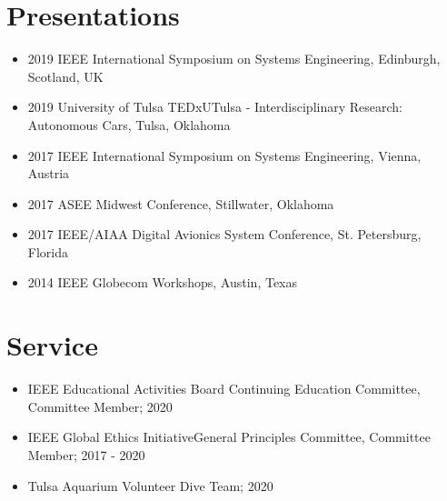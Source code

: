 \documentclass[line]{res} %
\begin{document}
\begin{resume}
\vspace{0.2in} %

\section{Presentations} 
\begin{itemize}
\item 2019 IEEE International Symposium on Systems Engineering, Edinburgh, Scotland, UK
\item 2019 University of Tulsa TEDxUTulsa - Interdisciplinary Research: Autonomous Cars, Tulsa, Oklahoma
\item 2017 IEEE International Symposium on Systems Engineering, Vienna, Austria
\item 2017 ASEE Midwest Conference, Stillwater, Oklahoma
\item 2017 IEEE/AIAA Digital Avionics System Conference, St. Petersburg, Florida
\item 2014 IEEE Globecom Workshops, Austin, Texas
\end{itemize}

\vspace{0.2in} %

\section{Service} 

\vspace{8pt} %

\begin{itemize}
\item IEEE Educational Activities Board Continuing Education Committee, Committee Member; 2020
\item IEEE Global Ethics InitiativeGeneral Principles Committee, Committee Member; 2017 - 2020
\item Tulsa Aquarium Volunteer Dive Team; 2020
\end{itemize}

\vspace{0.2in} %


\end{resume}
\end{document}
